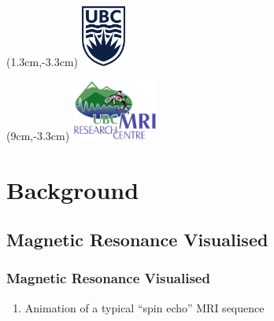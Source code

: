 



\begin{frame}
\titlepage
\begin{textblock*}{2cm}(1.3cm,-3.3cm)
    \includegraphics[height=2cm]{figures/ubc-logo}
\end{textblock*}
\begin{textblock*}{2cm}(9cm,-3.3cm)
    \includegraphics[height=2cm]{figures/UBC-MRI-logo}
\end{textblock*}
\end{frame}



\section{Background}

\subsection{Magnetic Resonance Visualised}

\begin{frame}
\frametitle{Magnetic Resonance Visualised}
\begin{enumerate}
    \item Animation of a typical ``spin echo'' MRI sequence
\end{enumerate}
\centering
{}
\end{frame}

